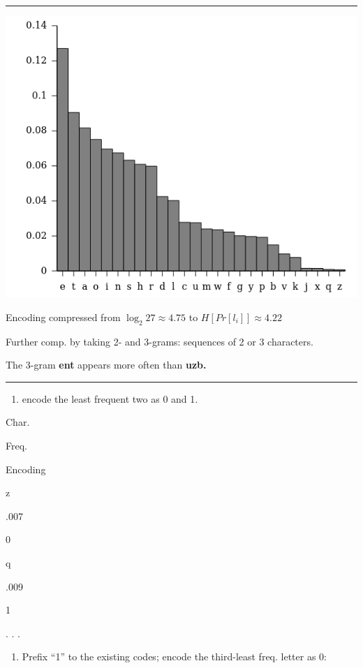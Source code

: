 \documentclass[
  letterpaper,
  DIV=11,
  numbers=noendperiod]{scrartcl}
\providecommand{\tightlist}{%
  \setlength{\itemsep}{0pt}\setlength{\parskip}{0pt}}\usepackage{longtable,booktabs,array}
\begin{document}
\begin{center}\rule{0.5\linewidth}{0.5pt}\end{center}

\includegraphics{./imgs/letters-frequency.png}

Encoding compressed from \(\log_2 27 \approx 4.75\) to
\(H[Pr[l_i]]\approx 4.22\)

Further comp. by taking 2- and 3-grams: sequences of 2 or 3 characters.

The 3-gram \textbf{ent} appears more often than \textbf{uzb.}

\begin{center}\rule{0.5\linewidth}{0.5pt}\end{center}

\begin{enumerate}
\def\labelenumi{\arabic{enumi}.}
\tightlist
\item
  encode the least frequent two as 0 and 1.
\end{enumerate}

Char.

Freq.

Encoding

z

.007

0

q

.009

1

. . .

\begin{enumerate}
\def\labelenumi{\arabic{enumi}.}
\setcounter{enumi}{3}
\tightlist
\item
  Prefix ``1'' to the existing codes; encode the third-least freq.
  letter as 0:
\end{enumerate}
\end{document}
